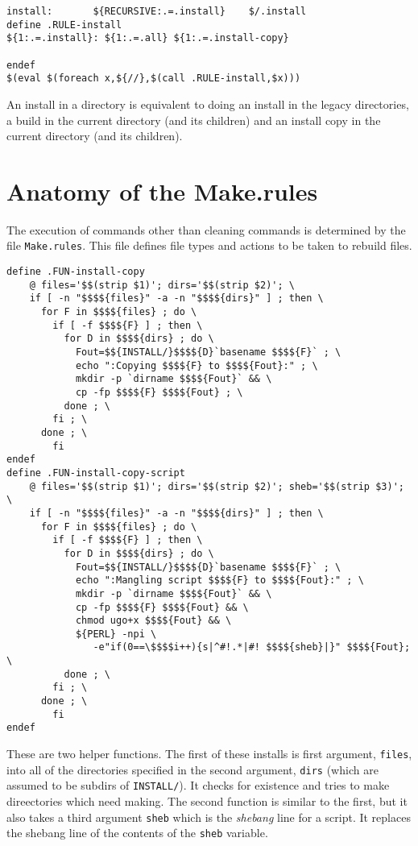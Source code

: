 \documentclass{article}
\begin{document}
\begin{verbatim}
install:       ${RECURSIVE:.=.install}    $/.install
define .RULE-install
${1:.=.install}: ${1:.=.all} ${1:.=.install-copy}

endef
$(eval $(foreach x,${//},$(call .RULE-install,$x)))
\end{verbatim}
An install in a directory is equivalent to doing an install in
the legacy directories, a build in the current directory (and
its children) and an install copy in the current directory
(and its children).

\section{Anatomy of the Make.rules}

The execution of commands other than cleaning commands is
determined by the file \verb+Make.rules+.  This file defines
file types and actions to be taken to rebuild files.

\begin{verbatim}
define .FUN-install-copy
	@ files='$$(strip $1)'; dirs='$$(strip $2)'; \
	if [ -n "$$$${files}" -a -n "$$$${dirs}" ] ; then \
	  for F in $$$${files} ; do \
	    if [ -f $$$${F} ] ; then \
	      for D in $$$${dirs} ; do \
	        Fout=$${INSTALL/}$$$${D}`basename $$$${F}` ; \
	        echo ":Copying $$$${F} to $$$${Fout}:" ; \
	        mkdir -p `dirname $$$${Fout}` && \
	        cp -fp $$$${F} $$$${Fout} ; \
	      done ; \
	    fi ; \
	  done ; \
        fi
endef
define .FUN-install-copy-script
	@ files='$$(strip $1)'; dirs='$$(strip $2)'; sheb='$$(strip $3)'; \
	if [ -n "$$$${files}" -a -n "$$$${dirs}" ] ; then \
	  for F in $$$${files} ; do \
	    if [ -f $$$${F} ] ; then \
	      for D in $$$${dirs} ; do \
	        Fout=$${INSTALL/}$$$${D}`basename $$$${F}` ; \
	        echo ":Mangling script $$$${F} to $$$${Fout}:" ; \
	        mkdir -p `dirname $$$${Fout}` && \
	        cp -fp $$$${F} $$$${Fout} && \
	        chmod ugo+x $$$${Fout} && \
	        ${PERL} -npi \
	           -e"if(0==\$$$$i++){s|^#!.*|#! $$$${sheb}|}" $$$${Fout}; \
	      done ; \
	    fi ; \
	  done ; \
        fi
endef
\end{verbatim}
These are two helper functions.  The first of these installs is first
argument, \verb+files+, into all of the directories specified in the
second argument, \verb+dirs+ (which are assumed to be subdirs of
\verb+INSTALL/+).  It checks for existence and tries to make
direectories which need making.  The second function is similar to the
first, but it also takes a third argument \verb+sheb+ which is the
{\em shebang} line for a script.  It replaces the shebang line of the
contents of the \verb+sheb+ variable.
\end{document}
